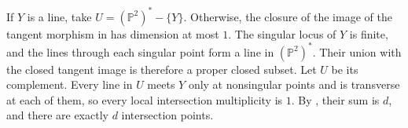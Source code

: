 If $Y$ is a line, take $U=(\mathbb{P}^2)^*-\{Y\}$. Otherwise, the closure of the image of the tangent morphism in  has dimension at most $1$. The singular locus of $Y$ is finite, and the lines through each singular point form a line in $(\mathbb{P}^2)^*$. Their union with the closed tangent image is therefore a proper closed subset. Let $U$ be its complement. Every line in $U$ meets $Y$ only at nonsingular points and is transverse at each of them, so every local intersection multiplicity is $1$. By , their sum is $d$, and there are exactly $d$ intersection points.
